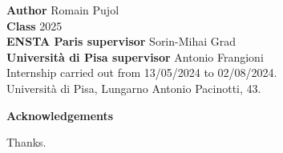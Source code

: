 \documentclass{amsart}
\begin{document}
\noindent\normalsize \textbf{Author} Romain Pujol  \\
\textbf{Class} 2025 \\

\noindent\textbf{ENSTA Paris supervisor} Sorin-Mihai Grad \\ 
\textbf{Università di Pisa supervisor} Antonio Frangioni \\

\noindent Internship carried out from 13/05/2024 to 02/08/2024. 
\\
Università di Pisa, Lungarno Antonio Pacinotti, 43.


\newpage
\thispagestyle{empty}
\mbox{}
\newpage






\begin{titlepage}

    \vspace*{5cm}
        \Large\textbf{Acknowledgements}
    \vspace{1cm}
    
    \normalsize Thanks.
\end{titlepage}

\newpage
\end{document}
